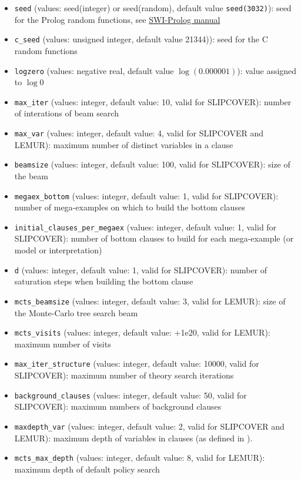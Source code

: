\begin{itemize}
\item \verb|seed| (values: seed(integer) or seed(random), default value \verb|seed(3032)|): seed for the Prolog random functions, see \href{http://www.swi-prolog.org/pldoc/man?predicate=set_random/1}{SWI-Prolog manual}
\item \verb|c_seed| (values: unsigned integer, default value 21344)): seed for the C random functions
\item \verb|logzero| (values: negative real, default value $\log(0.000001)$): value assigned to $\log 0$
\item \verb|max_iter| (values: integer, default value: 10, valid for  SLIPCOVER): number of interations of beam search
\item \verb|max_var| (values: integer, default value: 4, valid for 
SLIPCOVER and LEMUR): maximum number of distinct variables in a clause
\item \verb|beamsize|  (values: integer, default value: 100, valid for SLIPCOVER): size of the beam 
\item \verb|megaex_bottom| (values: integer, default value: 1, valid for SLIPCOVER): number of mega-examples on which to build the bottom clauses
\item \verb|initial_clauses_per_megaex| (values: integer, default value: 1, valid for SLIPCOVER): 
 number of bottom clauses to build for each mega-example (or 
 model or interpretation)
\item \verb|d| (values: integer, default value: 1, valid for SLIPCOVER): 
 number of saturation steps when building the bottom clause
\item \verb|mcts_beamsize|  (values: integer, default value: 3, valid for LEMUR): size of the Monte-Carlo tree search beam
\item \verb|mcts_visits|  (values: integer, default value: +1e20, valid for LEMUR): maximum number of visits 
\item \verb|max_iter_structure| (values: integer, default value: 10000, valid for SLIPCOVER): 
maximum  number of theory search iterations
\item \verb|background_clauses| (values: integer, default value: 50, valid for SLIPCOVER): 
 maximum numbers of background clauses
\item \verb|maxdepth_var| (values: integer, default value: 2, valid for SLIPCOVER and LEMUR): maximum depth of
variables in clauses (as defined in \cite{DBLP:journals/ai/Cohen95}).
\item \verb|mcts_max_depth|  (values: integer, default value: 8, valid for LEMUR): maximum depth of default policy search

\end{itemize}
